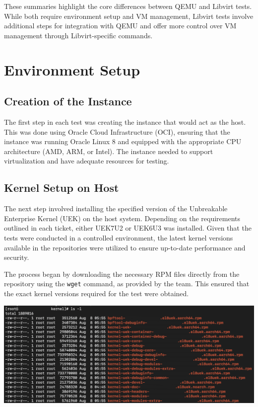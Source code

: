 These summaries highlight the core differences between QEMU and Libvirt tests. While both require environment setup and VM management, Libvirt tests involve additional steps for integration with QEMU and offer more control over VM management through Libvirt-specific commands.

\section{Environment Setup}

\subsection{Creation of the Instance}
The first step in each test was creating the instance that would act as the host. This was done using Oracle Cloud Infrastructure (OCI), ensuring that the instance was running Oracle Linux 8 and equipped with the appropriate CPU architecture (AMD, ARM, or Intel). The instance needed to support virtualization and have adequate resources for testing.

\subsection{Kernel Setup on Host}

The next step involved installing the specified version of the Unbreakable Enterprise Kernel (UEK) on the host system. Depending on the requirements outlined in each ticket, either UEK7U2 or UEK6U3 was installed. Given that the tests were conducted in a controlled environment, the latest kernel versions available in the repositories were utilized to ensure up-to-date performance and security.\mynewline

The process began by downloading the necessary RPM files directly from the repository using the \texttt{wget} command, as provided by the team. This ensured that the exact kernel versions required for the test were obtained.

\begin{center}
    \centering
    \includegraphics[width=\textwidth]{Images/kernel-rpm.png}
    \label{fig:casa}
\end{center}

